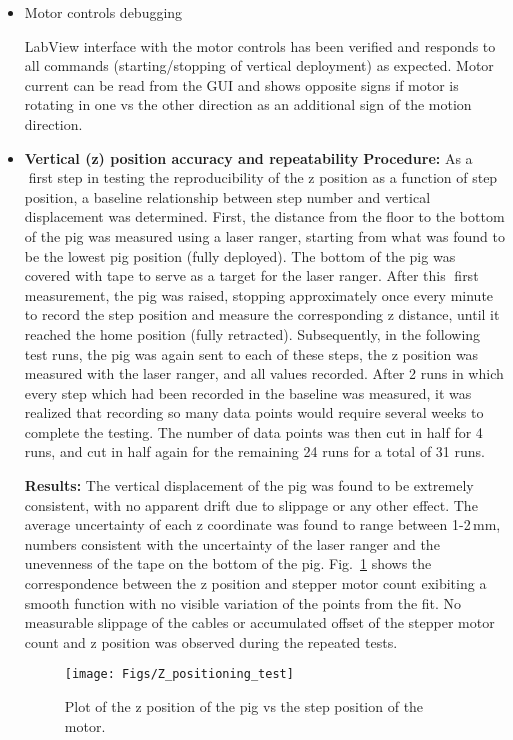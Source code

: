 \begin{itemize}
 \item{Motor controls debugging}

    LabView interface with the motor controls has been verified and responds to all commands (starting/stopping of vertical deployment) as expected.  Motor current can be read from the GUI and shows opposite signs if motor is rotating in one vs the other direction as an additional sign of the  motion direction.

\item{\bf Vertical (z) position accuracy and repeatability}
{\bf Procedure:} As a first step in testing the reproducibility of the z position as a function of step position,
a baseline relationship between step number and vertical displacement was determined. First, the distance
from the floor to the bottom of the pig was measured using a laser ranger, starting from what was found
to be the lowest pig position (fully deployed). The bottom of the pig was covered with tape to serve as a
target for the laser ranger. After this first measurement, the pig was raised, stopping approximately once
every minute to record the step position and measure the corresponding z distance, until it reached the home position (fully retracted). Subsequently, in the following test runs, the pig was again sent to each of these steps, the z position was measured with the laser ranger, and all values recorded. After 2 runs in which every step which had been recorded in the baseline was measured, it was realized that recording so many data points would require several weeks to complete the testing. The number of data points was then cut in half for 4 runs, and cut in half again for the remaining 24 runs for a total of 31 runs.

{\bf Results:} The vertical displacement of the pig was found to be extremely consistent, with no apparent
drift due to slippage or any other effect. The average uncertainty of each z coordinate was found to range
between 1-2\,mm, numbers consistent with the uncertainty of the laser ranger and the unevenness of the tape on the bottom of the pig. Fig.~\ref{fig:z_test} shows the correspondence between the z position and stepper motor count exibiting a smooth function with no visible variation of the points from the fit. No measurable slippage of the cables or accumulated offset of the stepper motor count and z position was observed during the repeated tests.

\begin{figure}[htbp]
 \centering
 \texttt{[image: Figs/Z\_positioning\_test]}
 \caption{Plot of the z position of the pig vs the step position of the motor.}
 \label{fig:z_test}
\end{figure}



\end{itemize}
